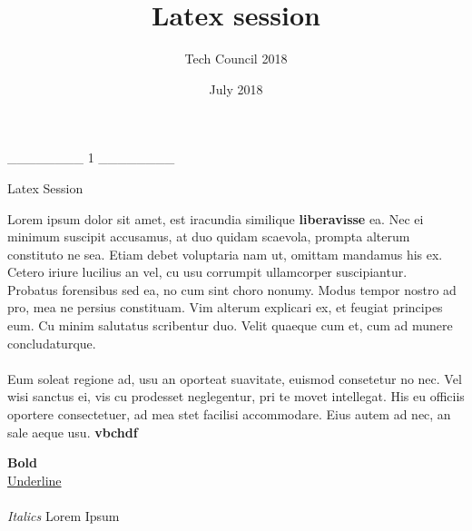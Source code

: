 \documentclass[a4paper,12pt]{article}
\title{Latex session}
\author{Tech Council 2018}
\date{July 2018}
\begin{document}
\maketitle

________ 1 ________%

Latex Session




\LARGE
 Lorem ipsum dolor sit amet, est iracundia similique \textbf{liberavisse} ea. Nec ei minimum suscipit accusamus, at duo quidam scaevola, prompta alterum constituto ne sea. Etiam debet voluptaria nam ut, omittam mandamus his ex. Cetero iriure lucilius an vel, cu usu corrumpit ullamcorper suscipiantur.    \\ %
 Probatus forensibus sed ea, no cum sint choro nonumy. Modus tempor nostro ad pro, mea ne persius constituam. Vim alterum explicari ex, et feugiat principes eum. Cu minim salutatus scribentur duo. Velit quaeque cum et, cum ad munere concludaturque.       \\\\
 Eum soleat regione ad, usu an oporteat suavitate, euismod consetetur no nec. Vel wisi sanctus ei, vis cu prodesset neglegentur, pri te movet intellegat. His eu officiis oportere consectetuer, ad mea stet facilisi accommodare. Eius autem ad nec, an sale aeque usu.
 \textbf{vbchdf}\textit{}

\textbf{Bold}\\
\underline{Underline}\\\\
\textit{Italics}
\clearpage
Lorem Ipsum
\end{document}

